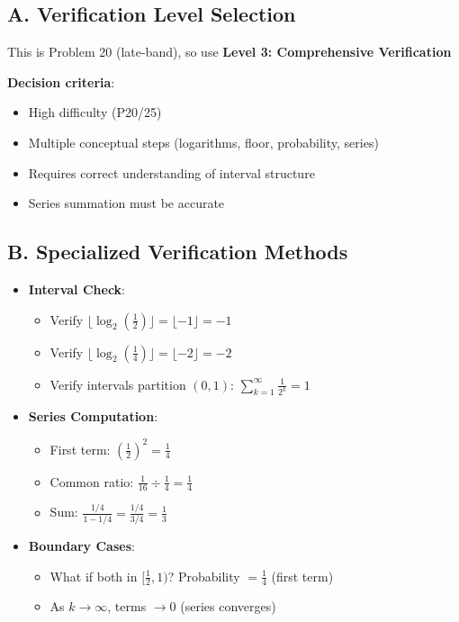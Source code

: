 \documentclass[11pt]{article}
\begin{document}
\begin{verificationbox}
\subsection*{A. Verification Level Selection}
This is Problem 20 (late-band), so use \textbf{Level 3: Comprehensive Verification}

\textbf{Decision criteria}:
\begin{itemize}
    \item High difficulty (P20/25)
    \item Multiple conceptual steps (logarithms, floor, probability, series)
    \item Requires correct understanding of interval structure
    \item Series summation must be accurate
\end{itemize}

\subsection*{B. Specialized Verification Methods}
\begin{itemize}[leftmargin=*]
    \item \textbf{Interval Check}:
    \begin{itemize}
        \item Verify $\lfloor\log_2(\frac{1}{2})\rfloor = \lfloor -1 \rfloor = -1$ \checkmark
        \item Verify $\lfloor\log_2(\frac{1}{4})\rfloor = \lfloor -2 \rfloor = -2$ \checkmark
        \item Verify intervals partition $(0,1)$: $\sum_{k=1}^{\infty} \frac{1}{2^k} = 1$ \checkmark
    \end{itemize}
    
    \item \textbf{Series Computation}:
    \begin{itemize}
        \item First term: $(\frac{1}{2})^2 = \frac{1}{4}$ \checkmark
        \item Common ratio: $\frac{1}{16} \div \frac{1}{4} = \frac{1}{4}$ \checkmark
        \item Sum: $\frac{1/4}{1-1/4} = \frac{1/4}{3/4} = \frac{1}{3}$ \checkmark
    \end{itemize}
    
    \item \textbf{Boundary Cases}:
    \begin{itemize}
        \item What if both in $[\frac{1}{2}, 1)$? Probability $= \frac{1}{4}$ (first term) \checkmark
        \item As $k \to \infty$, terms $\to 0$ (series converges) \checkmark
    \end{itemize}
    

\end{itemize}
\end{verificationbox}
\end{document}
